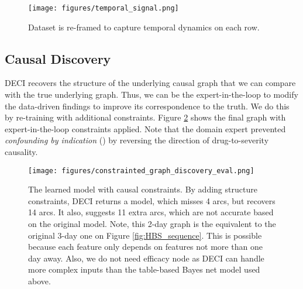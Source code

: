 \begin{figure}
    \centering
    \texttt{[image: figures/temporal\_signal.png]}
    \caption{Dataset is re-framed to capture temporal dynamics on each row.}
    \label{fig:temporal_featurized}
\end{figure}

\subsection{Causal Discovery}

DECI recovers the structure of the underlying causal graph that we can compare with the true underlying graph. Thus, we can be the expert-in-the-loop to modify the data-driven findings to improve its correspondence to the truth. We do this by re-training with additional constraints. Figure \ref{fig:discovered_graphs} shows the 
final graph with expert-in-the-loop constraints applied. Note that the domain expert prevented \textit{confounding by indication} (\cite{kyriacou2016confounding}) by reversing the direction of drug-to-severity causality. %


\begin{figure}
    \centering
    \texttt{[image: figures/constrainted\_graph\_discovery\_eval.png]}
     \caption{The learned model with causal constraints. By adding structure constraints, DECI returns a model, which misses 4 arcs, but recovers 14 arcs. It also, suggests 11 extra arcs, which are not accurate based on the original model. Note, this 2-day graph is the equivalent to the original 3-day one on Figure \ref{fig:HBS_sequence}. This is possible because each feature only depends on features not more than one day away. Also, we do not need efficacy node as DECI can handle more complex inputs than the table-based Bayes net model used above.}
        \label{fig:discovered_graphs}
\end{figure}

